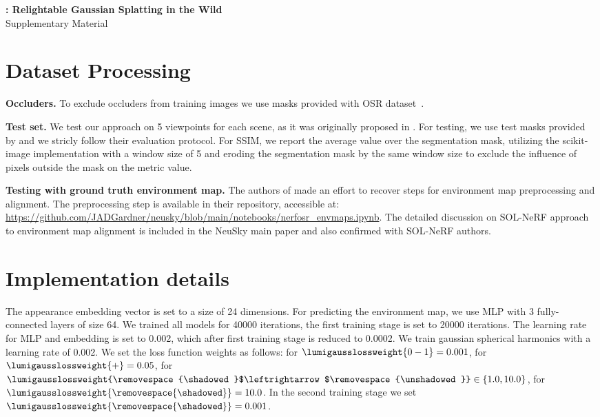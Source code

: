 {
\vspace{2.0em}
\centering
\Large
\textbf{\lumigauss: Relightable Gaussian Splatting in the Wild} \\
\vspace{0.5em}
 Supplementary Material \\ \vspace{1.0em} }

 \section{Dataset Processing}

\textbf{Occluders.
  }
  To exclude occluders from training images we use masks provided with OSR
  dataset~\cite{rudnev2022nerfosr}.

  \textbf{Test set.}
  We test our approach on 5 viewpoints for each scene, as it was originally
  proposed in \cite{rudnev2022nerfosr}.
  For testing, we use test masks provided by \cite{rudnev2022nerfosr} and we
  stricly follow their evaluation protocol.
  For SSIM, we report the average value over the segmentation mask, utilizing
  the scikit-image implementation with a window size of 5 and eroding the
  segmentation mask by the same window size to exclude the influence of pixels
  outside the mask on the metric value.

  \textbf{Testing with ground truth environment map.}
  The authors of \cite{gardner2023neusky} made an effort to recover steps for
  environment map preprocessing and alignment.
  The preprocessing step is available in their repository, accessible at:
  \url{https://github.com/JADGardner/neusky/blob/main/notebooks/nerfosr_envmaps.ipynb}.
  The detailed discussion on SOL-NeRF \cite{solnerf} approach to environment
  map alignment is included in the NeuSky main paper \cite{gardner2023neusky}
  and also confirmed with SOL-NeRF authors.

\section{Implementation details}

  The appearance embedding vector is set to a size of 24 dimensions.
  For predicting the environment map, we use MLP with 3 fully-connected layers
  of size 64.
  We trained all models for 40000 iterations, the first training stage is set
  to 20000 iterations.
  The learning rate for MLP and embedding is set to 0.002, which after first
  training stage is reduced to 0.0002.
  We train gaussian spherical harmonics with a learning rate of 0.002.
  We set the loss function weights as follows: for
  $\lumigausslossweight{0-1}=0.001$, for $\lumigausslossweight{+}=0.05$, for
  $\lumigausslossweight{\removespace{\shadowed}$\leftrightarrow$\removespace{\unshadowed}}
  \in \{1.0, 10.0\}$, for
  $\lumigausslossweight{\removespace{\shadowed}}=10.0$.
  In the second training stage we set
  $\lumigausslossweight{\removespace{\shadowed}}=0.001$.

